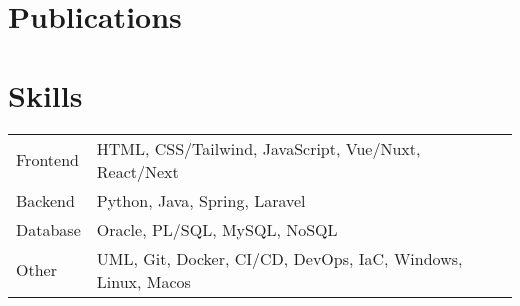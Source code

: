 \documentclass[a4paper,12pt]{article}
\begin{document}
\section{Publications}
\begin{refsection}
\nocite{*}
\printbibliography[heading=none]
\end{refsection}

\section{Skills}
\begin{tabularx}{\linewidth}{@{}l X@{}}
Frontend &  \normalsize{HTML, CSS/Tailwind, JavaScript, Vue/Nuxt, React/Next}\\
Backend  &  \normalsize{Python, Java, Spring, Laravel}\\
Database &  \normalsize{Oracle, PL/SQL, MySQL, NoSQL}\\
Other   &  \normalsize{UML, Git, Docker, CI/CD, DevOps, IaC, Windows, Linux, Macos}\\
\end{tabularx}

\vfill
{}
\end{document}

